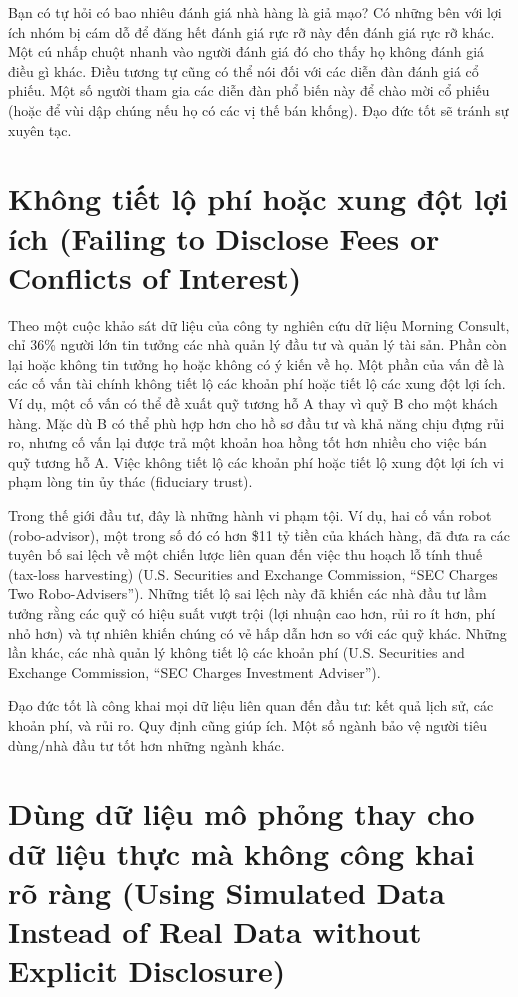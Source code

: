 Bạn có tự hỏi có bao nhiêu đánh giá nhà hàng là giả mạo? Có những bên với lợi ích nhóm bị cám dỗ để đăng hết đánh giá rực rỡ này đến đánh giá rực rỡ khác. Một cú nhấp chuột nhanh vào người đánh giá đó cho thấy họ không đánh giá điều gì khác. Điều tương tự cũng có thể nói đối với các diễn đàn đánh giá cổ phiếu. Một số người tham gia các diễn đàn phổ biến này để chào mời cổ phiếu (hoặc để vùi dập chúng nếu họ có các vị thế bán khống). Đạo đức tốt sẽ tránh sự xuyên tạc.

\section{Không tiết lộ phí hoặc xung đột lợi ích (Failing to Disclose Fees or Conflicts of Interest)}

Theo một cuộc khảo sát dữ liệu của công ty nghiên cứu dữ liệu Morning Consult, chỉ 36\% người lớn tin tưởng các nhà quản lý đầu tư và quản lý tài sản. Phần còn lại hoặc không tin tưởng họ hoặc không có ý kiến về họ. Một phần của vấn đề là các cố vấn tài chính không tiết lộ các khoản phí hoặc tiết lộ các xung đột lợi ích. Ví dụ, một cố vấn có thể đề xuất quỹ tương hỗ A thay vì quỹ B cho một khách hàng. Mặc dù B có thể phù hợp hơn cho hồ sơ đầu tư và khả năng chịu đựng rủi ro, nhưng cố vấn lại được trả một khoản hoa hồng tốt hơn nhiều cho việc bán quỹ tương hỗ A. Việc không tiết lộ các khoản phí hoặc tiết lộ xung đột lợi ích vi phạm lòng tin ủy thác (fiduciary trust).

Trong thế giới đầu tư, đây là những hành vi phạm tội. Ví dụ, hai cố vấn robot (robo-advisor), một trong số đó có hơn \$11 tỷ tiền của khách hàng, đã đưa ra các tuyên bố sai lệch về một chiến lược liên quan đến việc thu hoạch lỗ tính thuế (tax-loss harvesting) (U.S. Securities and Exchange Commission, ``SEC Charges Two Robo-Advisers''). Những tiết lộ sai lệch này đã khiến các nhà đầu tư lầm tưởng rằng các quỹ có hiệu suất vượt trội (lợi nhuận cao hơn, rủi ro ít hơn, phí nhỏ hơn) và tự nhiên khiến chúng có vẻ hấp dẫn hơn so với các quỹ khác. Những lần khác, các nhà quản lý không tiết lộ các khoản phí (U.S. Securities and Exchange Commission, ``SEC Charges Investment Adviser'').

Đạo đức tốt là công khai mọi dữ liệu liên quan đến đầu tư: kết quả lịch sử, các khoản phí, và rủi ro. Quy định cũng giúp ích. Một số ngành bảo vệ người tiêu dùng/nhà đầu tư tốt hơn những ngành khác.

\section{Dùng dữ liệu mô phỏng thay cho dữ liệu thực mà không công khai rõ ràng (Using Simulated Data Instead of Real Data without Explicit Disclosure)}

